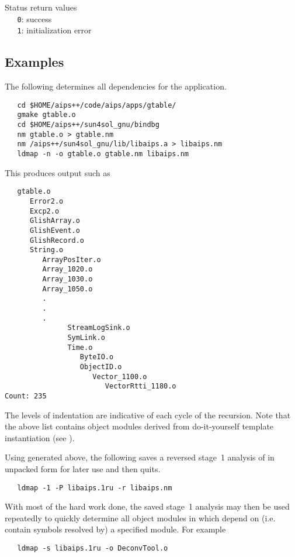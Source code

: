 Status return values
\\ \verb+   0+: success
\\ \verb+   1+: initialization error

\subsection*{Examples}

The following determines all dependencies for the  application.

\begin{verbatim}
   cd $HOME/aips++/code/aips/apps/gtable/
   gmake gtable.o
   cd $HOME/aips++/sun4sol_gnu/bindbg
   nm gtable.o > gtable.nm
   nm /aips++/sun4sol_gnu/lib/libaips.a > libaips.nm
   ldmap -n -o gtable.o gtable.nm libaips.nm
\end{verbatim}

\noindent
This produces output such as

\begin{verbatim}
   gtable.o
      Error2.o
      Excp2.o
      GlishArray.o
      GlishEvent.o
      GlishRecord.o
      String.o
         ArrayPosIter.o
         Array_1020.o
         Array_1030.o
         Array_1050.o
         .
         .
         .
               StreamLogSink.o
               SymLink.o
               Time.o
                  ByteIO.o
                  ObjectID.o
                     Vector_1100.o
                        VectorRtti_1180.o
Count: 235
\end{verbatim}

\noindent
The levels of indentation are indicative of each cycle of the recursion.  Note
that the above list contains object modules derived from do-it-yourself
template instantiation (see ).

Using  generated above, the following saves a reversed
stage~1 analysis of  in unpacked form for later use and then
quits.

\begin{verbatim}
   ldmap -1 -P libaips.1ru -r libaips.nm
\end{verbatim}

\noindent
With most of the hard work done, the saved stage~1 analysis may then be used
repeatedly to quickly determine all object modules in  which
depend on (i.e. contain symbols resolved by) a specified module.  For example

\begin{verbatim}
   ldmap -s libaips.1ru -o DeconvTool.o
\end{verbatim}

